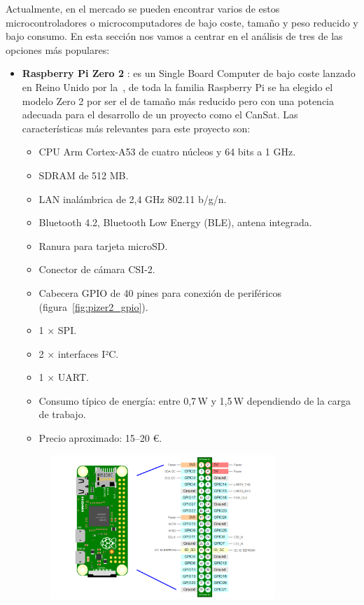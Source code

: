 Actualmente, en el mercado se pueden encontrar varios de estos microcontroladores o microcomputadores de bajo coste, tamaño y peso reducido y bajo consumo.
En esta sección nos vamos a centrar en el análisis de tres de las opciones más populares:
\begin{itemize}

    \item \textbf{Raspberry Pi Zero 2} \cite{raspberrypi_zero2}:
    es un Single Board Computer de bajo coste lanzado en Reino Unido por la~\cite{raspberrypi_foundation},
    de toda la familia Raspberry Pi se ha elegido el modelo Zero 2 por ser el de tamaño más reducido pero con una potencia adecuada para el desarrollo de un proyecto como el CanSat.
    Las características más relevantes para este proyecto son:
    \begin{itemize}
        \item CPU Arm Cortex-A53 de cuatro núcleos y 64 bits a 1 GHz.
        \item SDRAM de 512 MB.
        \item LAN inalámbrica de 2,4 GHz 802.11 b/g/n.
        \item Bluetooth 4.2, Bluetooth Low Energy (BLE), antena integrada.
        \item Ranura para tarjeta microSD.
        \item Conector de cámara CSI-2.
        \item Cabecera GPIO de 40 pines para conexión de periféricos (figura~\ref{fig:pizer2_gpio}).
        \item 1 × SPI.
        \item 2 × interfaces I²C.
        \item 1 × UART.
        \item Consumo típico de energía: entre 0,7\,W y 1,5\,W dependiendo de la carga de trabajo.
        \item Precio aproximado: 15–20 \euro.
    \end{itemize}
    \begin{figure}[h]
        \centering
        \includegraphics[width=0.8\textwidth]{Imagenes/Bitmap/pizero2gpio}

\end{figure}
\end{itemize}
